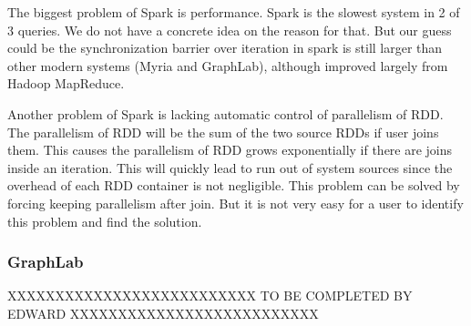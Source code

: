 The biggest problem of Spark is performance. Spark is the slowest system in 2 
of 3 queries. We do not have a concrete idea on the reason for that. But our 
guess could be the synchronization barrier over iteration in spark is still 
larger than other modern systems (Myria and GraphLab), although improved 
largely from Hadoop MapReduce.

Another problem of Spark is lacking automatic control of parallelism of RDD. 
The parallelism of RDD will be the sum of the two source RDDs if user joins
them. This causes the parallelism of RDD grows exponentially if there are
joins inside an iteration. This will quickly lead to run out of system 
sources since the overhead of each RDD container is not negligible. This 
problem can be solved by forcing keeping parallelism after join. But it is
not very easy for a user to identify this problem and find the solution.   
    
\subsubsection{GraphLab}

XXXXXXXXXXXXXXXXXXXXXXXXXX
TO BE COMPLETED BY EDWARD
XXXXXXXXXXXXXXXXXXXXXXXXXX